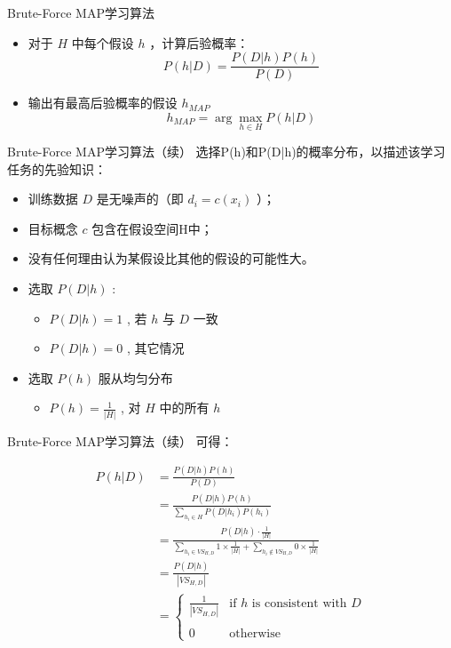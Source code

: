\documentclass[presentation]{beamer}
\begin{document}
\begin{frame}[label={sec:org828fcb5}]{Brute-Force MAP学习算法}
\begin{itemize}
\item 对于 \(H\) 中每个假设 \(h\) ，计算后验概率：
$$P(h|D) = \frac{P(D|h) P(h)}{P(D)}$$
\item 输出有最高后验概率的假设 \(h_{MAP}\) 
$$h_{MAP} = \arg \max_{h \in H} P(h|D)$$
\end{itemize}
\end{frame}

\begin{frame}[label={sec:orgfc513a4}]{Brute-Force MAP学习算法（续）}
选择P(h)和P(D|h)的概率分布，以描述该学习任务的先验知识：
\begin{itemize}
\item 训练数据 \(D\) 是无噪声的（即 \(d_i=c(x_i)\) ）；
\item 目标概念 \(c\) 包含在假设空间H中；
\item 没有任何理由认为某假设比其他的假设的可能性大。
\item 选取 \(P(D|h)\) :
\begin{itemize}
\item \(P(D|h)=1\) , 若 \(h\) 与 \(D\) 一致
\item \(P(D|h)=0\) , 其它情况
\end{itemize}
\item 选取 \(P(h)\) 服从均匀分布
\begin{itemize}
\item \(P(h) = \frac{1}{|H|}\) , 对 \(H\) 中的所有 \(h\)
\end{itemize}
\end{itemize}
\end{frame}

\begin{frame}[label={sec:orgb8faa28}]{Brute-Force MAP学习算法（续）}
可得：

\begin{align*}
P(h|D) &=\frac{P(D|h)P(h)}{P(D)}\\
&=\frac{P(D|h)P(h)}{\sum_{h_i\in H}P(D|h_i)P(h_i)}\\
&=\frac{P(D|h)\cdot \frac{1}{|H|}}{\sum_{h_i\in VS_{H,D}}1\times \frac{1}{|H|}+\sum_{h_i\not\in VS_{H,D}}0\times \frac{1}{|H|}}\\
&=\frac{P(D|h)}{|VS_{H,D}|}\\
&= \left\{ \begin{array}{cl}
  \frac{1}{|VS_{H,D}|} & \mbox{if $h$ is consistent with $D$} \\
\\
  0  & \mbox{otherwise} 
\end{array} \right.
\end{align*}
\end{frame}
\end{document}
